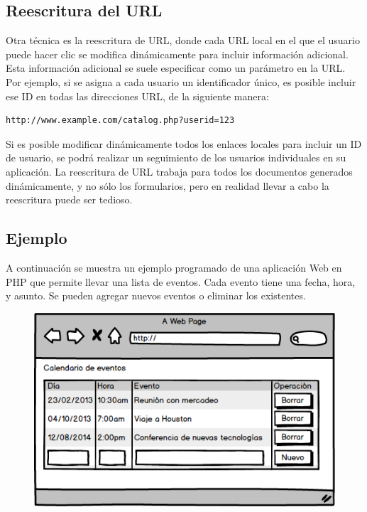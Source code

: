\documentclass[a5paper,10pt,spanish]{sphinxmanual}
\begin{document}
\subsection{Reescritura del URL}
\label{Tutorial3_Sesiones.md:reescritura-del-url}
Otra técnica es la reescritura de URL, donde cada URL local en el que el
usuario puede hacer clic se modifica dinámicamente para incluir
información adicional. Esta información adicional se suele especificar
como un parámetro en la URL. Por ejemplo, si se asigna a cada usuario un
identificador único, es posible incluir ese ID en todas las direcciones
URL, de la siguiente manera:

\begin{Verbatim}[commandchars=\\\{\}]
http://www.example.com/catalog.php?userid=123
\end{Verbatim}

Si es posible modificar dinámicamente todos los enlaces locales para
incluir un ID de usuario, se podrá realizar un seguimiento de los
usuarios individuales en su aplicación. La reescritura de URL trabaja
para todos los documentos generados dinámicamente, y no sólo los
formularios, pero en realidad llevar a cabo la reescritura puede ser
tedioso.


\subsection{Ejemplo}
\label{Tutorial3_Sesiones.md:ejemplo}
A continuación se muestra un ejemplo programado de una aplicación Web en
PHP que permite llevar una lista de eventos. Cada evento tiene una
fecha, hora, y asunto. Se pueden agregar nuevos eventos o eliminar los
existentes.
\begin{figure}[htbp]
\centering

\includegraphics{Eventos.png}
\end{figure}
\end{document}
